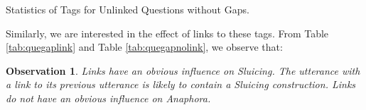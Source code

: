 \documentclass[bsc,frontabs,twoside,singlespacing,parskip,deptreport]{infthesis}     %
\newtheorem{observation}{Observation}[chapter]
\begin{document}
\begin{minipage}{\textwidth}
\begin{minipage}[t]{0.45\textwidth}
        \end{minipage}
        \begin{minipage}[t]{0.45\textwidth}
        \centering
        \makeatletter{}\makeatother


\caption{Statistics of Tags for Unlinked Questions without Gaps.}
\label{tab:quegapnolink}

        \end{minipage}
    \end{minipage}


Similarly, we are interested in the effect of links to these tags. From Table \ref{tab:quegaplink} and Table \ref{tab:quegapnolink}, we observe that:

\begin{observation}
Links have an obvious influence on Sluicing. The utterance with a link to its previous utterance is likely to contain a Sluicing construction. Links do not have an obvious influence on Anaphora.
\end{observation}
\end{document}
